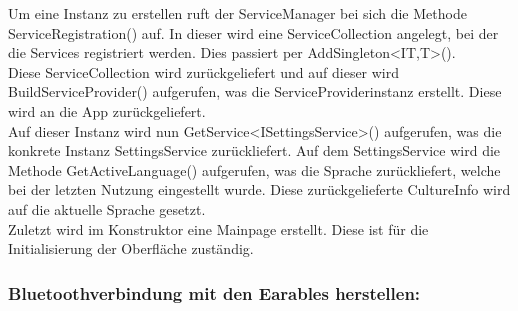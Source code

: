 \documentclass[a4paper,12pt]{article}
\begin{document}
Um eine Instanz zu erstellen ruft der ServiceManager bei sich die Methode ServiceRegistration() auf. In dieser wird eine ServiceCollection angelegt, bei der die Services registriert werden. Dies passiert per AddSingleton<IT,T>(). \\
Diese ServiceCollection wird zurückgeliefert und auf dieser wird BuildServiceProvider() aufgerufen, was die ServiceProviderinstanz erstellt.
Diese wird an die App zurückgeliefert.\\
Auf dieser Instanz wird nun GetService<ISettingsService>() aufgerufen, was die konkrete Instanz SettingsService zurückliefert.
Auf dem SettingsService wird die Methode GetActiveLanguage() aufgerufen, was die Sprache zurückliefert, welche bei der letzten Nutzung eingestellt wurde. 
Diese zurückgelieferte CultureInfo wird auf die aktuelle Sprache gesetzt.\\
Zuletzt wird im Konstruktor eine Mainpage erstellt. Diese ist für die Initialisierung der Oberfläche zuständig.\\


\newpage
\subsubsection{Bluetoothverbindung mit den Earables herstellen:}
\end{document}
